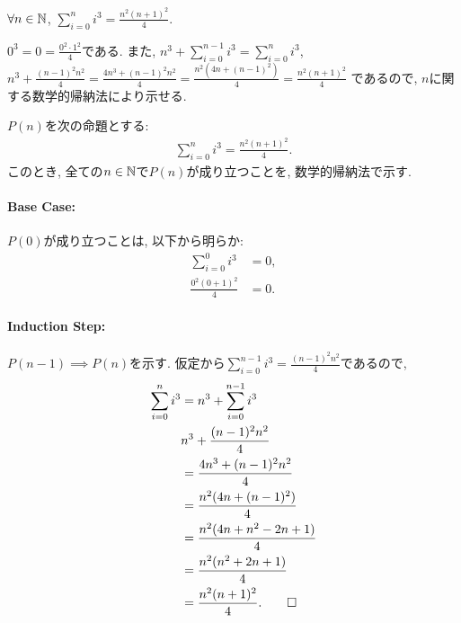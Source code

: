 \begin{prop}
  \label{p:20230710}
  $\forall n\in \mathbb{N}$, $\sum_{i=0}^n i^3=\frac{n^2(n+1)^2}{4}$.
\end{prop}

\begin{proof**}
  $0^3=0=\frac{0^2\cdot 1^2}{4}$である.
  また,
    $n^3+\sum_{i=0}^{n-1}i^3=\sum_{i=0}^{n}i^3$,
    $n^3+\frac{(n-1)^2n^2}{4}=\frac{4n^3+(n-1)^2n^2}{4}=\frac{n^2(4n+(n-1)^2)}{4}=\frac{n^2(n+1)^2}{4}$
  であるので,
  $n$に関する数学的帰納法により示せる.
\end{proof**}

\begin{proof*}
  $P(n)$を次の命題とする:
  \begin{align*}
    \sum_{i=0}^{n}i^3=\frac{n^2(n+1)^2}{4}.
  \end{align*}
  このとき,
  全ての$n\in\mathbb{N}$で$P(n)$が成り立つことを,
  数学的帰納法で示す.

  \paragraph{Base Case:}
  $P(0)$が成り立つことは, 以下から明らか:
  \begin{align*}
    \sum_{i=0}^{0}i^3&=0,\\
    \frac{0^2(0+1)^2}{4}&=0.
  \end{align*}

  \paragraph{Induction Step:}
  $P(n-1)\implies P(n)$を示す.
  仮定から$\sum_{i=0}^{n-1}i^3=\frac{(n-1)^2n^2}{4}$であるので,
  \begin{align*}
    \sum_{i=0}^{n}i^3
    &=n^3+\sum_{i=0}^{n-1}i^3\\
    &n^3+\frac{(n-1)^2n^2}{4}\\
    &=\frac{4n^3+(n-1)^2n^2}{4}\\
    &=\frac{n^2(4n+(n-1)^2)}{4}\\
    &=\frac{n^2(4n+n^2-2n+1)}{4}\\
    &=\frac{n^2(n^2+2n+1)}{4}\\
    &=\frac{n^2(n+1)^2}{4}
    .\qedhere
  \end{align*}
\end{proof*}


